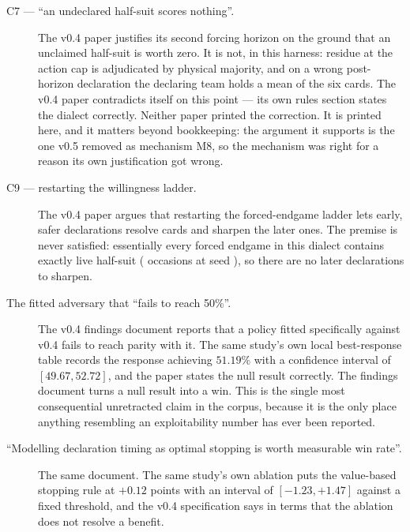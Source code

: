 \begin{description}

\item[C7 --- ``an undeclared half-suit scores nothing''.] The v0.4 paper justifies its second
  forcing horizon on the ground that an unclaimed half-suit is worth zero. It is not, in this
  harness: residue at the action cap is adjudicated by physical majority, and on a wrong
  post-horizon declaration the declaring team holds a mean \numResidueHeld{} of the six cards. The
  v0.4 paper contradicts itself on this point --- its own rules section states the dialect
  correctly. Neither paper printed the correction. It is printed here, and it matters beyond
  bookkeeping: the argument it supports is the one v0.5 removed as mechanism M8, so the mechanism
  was right for a reason its own justification got wrong.

\item[C9 --- restarting the willingness ladder.] The v0.4 paper argues that restarting the
  forced-endgame ladder lets early, safer declarations resolve cards and sharpen the later ones.
  The premise is never satisfied: essentially every forced endgame in this dialect contains exactly
  \numLadderLiveSets{} live half-suit (\numLadderOccasions{} occasions at seed \numLadderSeed{}), so
  there are no later declarations to sharpen.

\item[The fitted adversary that ``fails to reach 50\%''.] The v0.4 findings document reports that a
  policy fitted specifically against v0.4 fails to reach parity with it. The same study's own local
  best-response table records the response achieving $51.19\%$ with a confidence interval of
  $[49.67, 52.72]$, and the paper states the null result correctly. The findings document turns a
  null result into a win. This is the single most consequential unretracted claim in the corpus,
  because it is the only place anything resembling an exploitability number has ever been reported.

\item[``Modelling declaration timing as optimal stopping is worth measurable win rate''.] The same
  document. The same study's own ablation puts the value-based stopping rule at $+0.12$ points with
  an interval of $[-1.23, +1.47]$ against a fixed threshold, and the v0.4 specification says in
  terms that the ablation does not resolve a benefit.

\end{description}

